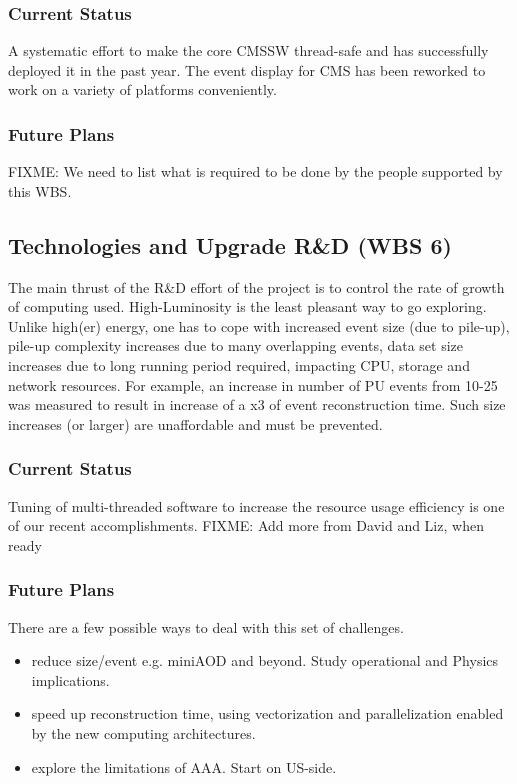 \documentclass[11pt,a4paper]{article}
\begin{document}
\subsubsection{Current Status}

A systematic effort to make the core CMSSW thread-safe and has
successfully deployed it in the past year.  The event display
for CMS has been reworked to work on a variety of platforms
conveniently.

\subsubsection{Future Plans}

{FIXME: We need to list what is required to be done by the people
  supported by this WBS.}

\subsection{Technologies and Upgrade R\&D (WBS 6)}

The main thrust of the R\&D effort of the project is to control the
rate of growth of computing used.  High-Luminosity is the least
pleasant way to go exploring. Unlike high(er) energy, one has to cope
with increased event size (due to pile-up), pile-up complexity
increases due to many overlapping events, data set size increases due
to long running period required, impacting CPU, storage and network
resources.  For example, an increase in number of PU events from 10-25
was measured to result in increase of a x3 of event reconstruction
time. Such size increases (or larger) are unaffordable and must be
prevented.

\subsubsection{Current Status}

Tuning of multi-threaded software to increase the resource
usage efficiency is one of our recent accomplishments.  
{FIXME: Add more from David and Liz, when ready}

\subsubsection{Future Plans}

There are a few possible ways to deal with this set of challenges. 
\begin{itemize}
\item reduce size/event e.g. miniAOD and beyond. Study operational and Physics implications.
\item speed up reconstruction time, using vectorization and parallelization enabled by the new computing architectures. 
\item explore the limitations of AAA. Start on US-side.  
\end{itemize}
\end{document}
